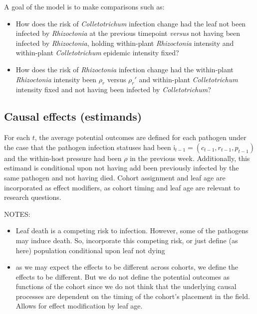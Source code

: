 \documentclass[]{article}
\providecommand{\tightlist}{%
  \setlength{\itemsep}{0pt}\setlength{\parskip}{0pt}}
\begin{document}
A goal of the model is to make comparisons such as:

\begin{itemize}
\tightlist
\item
  How does the risk of \emph{Colletotrichum} infection change had the
  leaf not been infected by \emph{Rhizoctonia} at the previous timepoint
  \emph{versus} not having been infected by \emph{Rhizoctonia}, holding
  within-plant \emph{Rhizoctonia} intensity and within-plant
  \emph{Colletotrichum} epidemic intensity fixed?
\item
  How does the risk of \emph{Rhizoctonia} infection change had the
  within-plant \emph{Rhizoctonia} intensity been \(\rho_r\) versus
  \(\rho_r'\) and within-plant \emph{Colletotrichum} intensity fixed and
  not having been infected by \emph{Colletotrichum}?
\end{itemize}

\hypertarget{causal-effects-estimands}{%
\subsection{Causal effects (estimands)}\label{causal-effects-estimands}}

For each \(t\), the average potential outcomes are defined for each
pathogen under the case that the pathogen infection statuses had been
\(\mathsf{i}_{t - 1} = (c_{t -1}, r_{t-1}, p_{t-1})\) and the
within-host pressure had been \(\rho\) in the previous week.
Additionally, this estimand is conditional upon not having add been
previously infected by the same pathogen and not having died. Cohort
assignment and leaf age are incorporated as effect modifiers, as cohort
timing and leaf age are relevant to research questions.

NOTES:

\begin{itemize}
\tightlist
\item
  Leaf death is a competing risk to infection. However, some of the
  pathogens may induce death. So, incorporate this competing risk, or
  just define (as here) population conditional upon leaf not dying
\item
  as we may expect the effects to be different across cohorts, we define
  the effects to be different. But we do not define the potential
  outcomes as functions of the cohort since we do not think that the
  underlying causal processes are dependent on the timing of the
  cohort's placement in the field. Allows for effect modification by
  leaf age.
\end{itemize}
\end{document}
